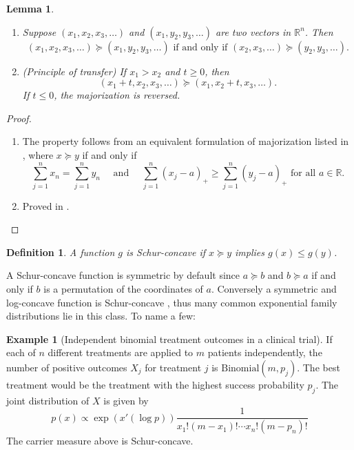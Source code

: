 \documentclass[11pt]{article}
\newtheorem{definition}{Definition}
\newtheorem{lemma}[corollary]{Lemma}
\theoremstyle{definition}
\newtheorem{example}{Example}
\theoremstyle{custom}
\newcommand{\RR}{\mathbb{R}}
\begin{document}
\begin{lemma}~\\
\begin{enumerate}
\item Suppose $\left(x_1, x_2, x_3, \ldots\right)$ and $\left(x_1, y_2, y_3, \ldots\right)$ are two vectors in $\RR^n$. Then
$$\left(x_1, x_2, x_3, \ldots\right) \succeq \left(x_1, y_2, y_3, \ldots\right) \text{ if and only if } \left(x_2, x_3, \ldots\right) \succeq \left(y_2, y_3, \ldots\right).$$
\item (Principle of transfer) If $x_1 > x_2$ and $t \ge 0$, then
$$\left(x_1 + t, x_2, x_3, \ldots\right) \succeq \left(x_1, x_2 + t, x_3, \ldots\right).$$
If $t \le 0$, the majorization is reversed.
\end{enumerate}
\label{lma:twoprop}
\end{lemma}

\begin{proof}~\\
\begin{enumerate}
\item The property follows from an equivalent formulation of majorization listed in \citet{Marshall:2010hb}, where $x \succeq y$ if and only if
$$\sum_{j=1}^n x_n = \sum_{j=1}^n y_n \quad \text{ and } \quad \sum_{j=1}^n \left(x_j - a\right)_+ \ge \sum_{j=1}^n \left(y_j - a\right)_+ \text{ for all } a \in \RR.$$

\item Proved in \citet{Marshall:2010hb}. \qedhere
\end{enumerate}
\end{proof}

\begin{definition}
A function $g$ is Schur-concave if $x \succeq y$ implies $g\left(x\right) \le g\left(y\right)$.
\end{definition}

A Schur-concave function is symmetric by default since $a \succeq b$ and $b \succeq a$ if and only if $b$ is a permutation of the coordinates of $a$. Conversely a symmetric and log-concave function is Schur-concave \citep{Marshall:2010hb}, thus many common exponential family distributions lie in this class. To name a few:

\begin{example}[Independent binomial treatment outcomes in a clinical trial]
 If each of $n$ different treatments are applied to $m$ patients independently, the number of positive outcomes $X_j$ for treatment $j$ is $\text{Binomial}\left(m, p_j\right)$. The best treatment would be the treatment with the highest success probability $p_j$. The joint distribution of $X$ is given by
$$p\left(x\right) \propto \exp\left(x' \left(\log p\right)\right) \frac{1}{x_1! \left(m-x_1\right)! \cdots x_n! \left(m-p_n\right)!}$$
The carrier measure above is Schur-concave.
\end{example}
\end{document}
